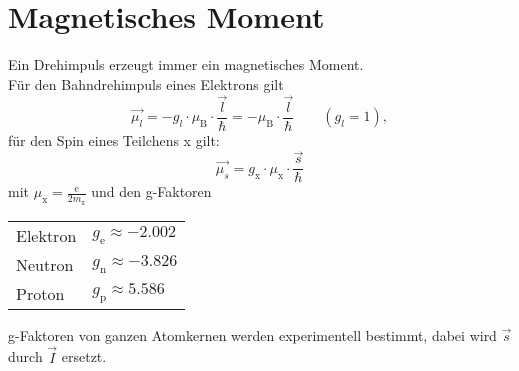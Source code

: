 \section{Magnetisches Moment}
Ein Drehimpuls erzeugt immer ein magnetisches Moment.\\
Für den Bahndrehimpuls eines Elektrons gilt
\begin{equation*}
\vec{\mu_l}
= -g_l \cdot \mu_\text{B} \cdot \frac{\vec{l}}{\hbar}
= - \mu_\text{B} \cdot \frac{\vec{l}}{\hbar} \qquad (g_l = 1),
\end{equation*}
für den Spin eines Teilchens x gilt:
\begin{equation*}
\vec{\mu_s} = g_\text{x} \cdot \mu_\text{x} \cdot \frac{\vec{s}}{\hbar}
\end{equation*}
mit $\mu_\text{x} = \frac{\text{e}}{2 m_\text{x}}$ und den g-Faktoren
\begin{center}
\begin{tabular}{ll}
	Elektron&	$g_\text{e} \approx \num{-2.002}$\\
	Neutron&	$g_\text{n} \approx \num{-3.826}$\\
	Proton&	$g_\text{p} \approx \num{+5.586}$\\
\end{tabular}
\end{center}
g-Faktoren von ganzen Atomkernen werden experimentell bestimmt, dabei wird $\vec{s}$ durch $\vec{I}$ ersetzt.
